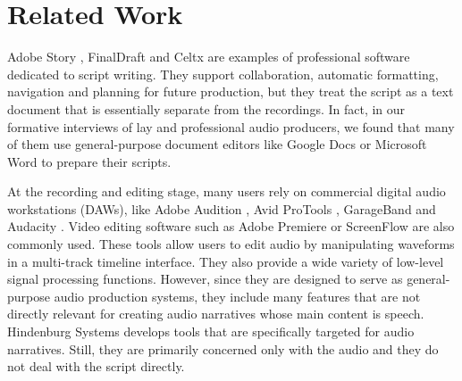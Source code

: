 \section{Related Work}

Adobe Story \cite{adobestory2016}, FinalDraft \cite{finaldraft2016} and Celtx \cite{celtx2016} are examples of professional software dedicated to script writing. They support collaboration, automatic formatting, navigation and planning for future production, but they treat the script as a text document that is essentially separate from the recordings. In fact, in our formative interviews of lay and professional audio producers, we found that many of them use general-purpose document editors like Google Docs \cite{googledocs2016} or Microsoft Word \cite{microsoftword2016} to prepare their scripts.

At the recording and editing stage, many users rely on commercial digital audio workstations (DAWs), like Adobe Audition \cite{adobeaudition2016}, Avid ProTools \cite{avidprotools}, GarageBand \cite{garageband} and Audacity \cite{audacity}. Video editing software such as Adobe Premiere \cite{premier} or ScreenFlow \cite{screenflow} are also commonly used. These tools allow users to edit audio by manipulating waveforms in a multi-track timeline interface. They also provide a wide variety of low-level signal processing functions. However, since they are designed to serve as general-purpose audio production systems, they include many features that are not directly relevant for creating audio narratives whose main content is speech. Hindenburg Systems \cite{hindenburg} develops tools that are specifically targeted for audio narratives. Still, they are primarily concerned only with the audio and they do not deal with the script directly.   

